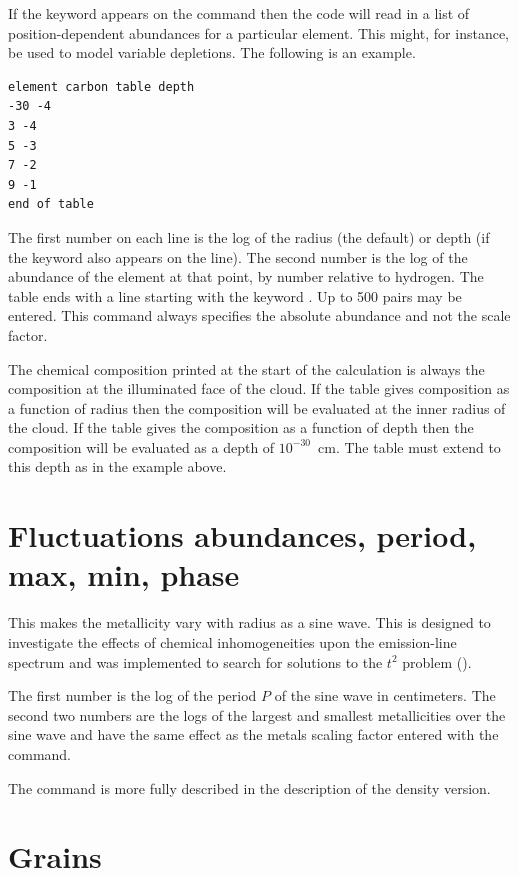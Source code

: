 If the keyword  appears on
the  command then the code
will read in a list of position-dependent abundances for
a particular element.
This might, for instance, be used to model variable depletions.
The following is an example.
\begin{verbatim}
element carbon table depth
-30 -4
3 -4
5 -3
7 -2
9 -1
end of table
\end{verbatim}

The first number on each line is the log of the radius (the default)
or depth (if the keyword  also appears
on the  line).
The second number is the
log of the abundance of the element at that point, by number relative to
hydrogen.
The table ends with a line starting with the keyword
.
Up to 500 pairs may be entered.
This command always specifies the absolute
abundance and not the scale factor.

The chemical composition printed at the start of the calculation is always
the composition at the illuminated face of the cloud.  If the table gives
composition as a function of radius then the composition will be evaluated
at the inner radius of the cloud.  If the table gives the composition as
a function of depth then the composition will be evaluated as a depth of
$10^{-30}$~cm.  The table must extend to this depth as in the example above.

\section{Fluctuations abundances, period, max, min, phase}

This makes the metallicity vary with radius as a sine wave.  This is
designed to investigate the effects of chemical inhomogeneities upon the
emission-line spectrum and was implemented to search for solutions to the
$t^2$ problem (\citealp{KingdonFerland1995}).

The first number is the log of the period $P$ of the sine wave in
centimeters.
The second two numbers are the logs of the largest and smallest
metallicities over the sine wave and have the same effect as the metals
scaling factor entered with the  command.

The  command is more fully described in
the description of the density version.

\section{Grains}
\label{sec:GrainsCommand}

